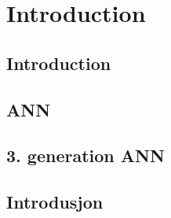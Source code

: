 
\chapter{Introduction} %
\section{Introduction}
\section{ANN}
\section{3. generation ANN}



\section{Introdusjon}
%
%







